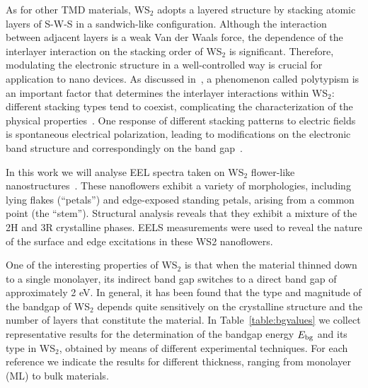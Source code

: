 As for other TMD materials, WS$_2$ adopts a layered structure 
by stacking atomic layers of S-W-S in a sandwich-like configuration. 
%
Although the interaction between adjacent layers is a weak Van der Waals 
force, the dependence of the interlayer interaction on the stacking 
order of WS$_2$ is significant.
%
Therefore, modulating the electronic
structure in a well-controlled way is crucial for application to
nano devices.
%
As discussed in~\cite{SabryaWS2},
a phenomenon called polytypism is an important factor that determines the interlayer
interactions within WS$_2$: different stacking types tend to coexist, 
complicating the characterization of the physical properties~\cite{Na:2018}.
%
One response of different stacking patterns to electric fields is
spontaneous electrical polarization, leading to modifications on the 
electronic band structure and correspondingly on the band gap~\cite{Lee:2016}.

In this work we will analyse EEL spectra taken on WS$_2$ flower-like nanostructures~\cite{SabryaWS2}.
%
These nanoflowers  exhibit a  variety of morphologies, including lying flakes (“petals”) and
edge-exposed standing petals, arising from a common point (the “stem”).
%
 Structural analysis reveals that they exhibit a mixture of the 2H and 3R crystalline phases. 
%
EELS measurements were used to reveal the nature of the surface and edge excitations in these WS2 nanoflowers.

One of the interesting properties of  WS$_2$ is
that when the material
thinned down to a single monolayer, its indirect band gap switches to a direct band gap of approximately 2 eV.
%
In general, it has been found that the type and magnitude of the bandgap
of WS$_2$ depends quite sensitively on the crystalline structure and
the number of layers that constitute the material.
%
In Table~\ref{table:bgvalues} we collect
representative results for the determination of the bandgap energy $E_{\rm bg}$
and its type in WS$_2$, obtained by means of different experimental techniques.
%
For each reference we indicate the results for different thickness, ranging from monolayer (ML)
to bulk materials.

